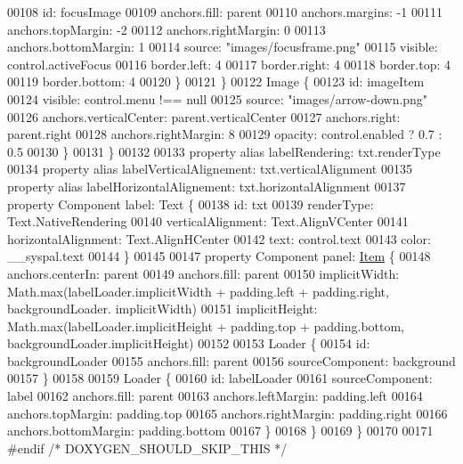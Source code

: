 \begin{DoxyCode}
00108                 \textcolor{keywordtype}{id}: focusImage
00109                 anchors.fill: parent
00110                 anchors.margins: -1
00111                 anchors.topMargin: -2
00112                 anchors.rightMargin: 0
00113                 anchors.bottomMargin: 1
00114                 source: \textcolor{stringliteral}{"images/focusframe.png"}
00115                 visible: control.activeFocus
00116                 border.left: 4
00117                 border.right: 4
00118                 border.top: 4
00119                 border.bottom: 4
00120             \}
00121         \}
00122         Image \{
00123             \textcolor{keywordtype}{id}: imageItem
00124             visible: control.menu !== null
00125             source: \textcolor{stringliteral}{"images/arrow-down.png"}
00126             anchors.verticalCenter: parent.verticalCenter
00127             anchors.right: parent.right
00128             anchors.rightMargin: 8
00129             opacity: control.enabled ? 0.7 : 0.5
00130         \}
00131     \}
00132 
00133     \textcolor{keyword}{property} alias labelRendering: txt.renderType
00134     \textcolor{keyword}{property} alias labelVerticalAlignement: txt.verticalAlignment
00135     \textcolor{keyword}{property} alias labelHorizontalAlignement: txt.horizontalAlignment
00137     \textcolor{keyword}{property} Component label: Text \{
00138         \textcolor{keywordtype}{id}: txt
00139         renderType: Text.NativeRendering
00140         verticalAlignment: Text.AlignVCenter
00141         horizontalAlignment: Text.AlignHCenter
00142         text: control.text
00143         color: \_\_syspal.text
00144     \}
00145 
00147     \textcolor{keyword}{property} Component panel: \hyperlink{classItem}{Item} \{
00148         anchors.centerIn: parent
00149         anchors.fill: parent
00150         implicitWidth: Math.max(labelLoader.implicitWidth + padding.left + padding.right, backgroundLoader.
      implicitWidth)
00151         implicitHeight: Math.max(labelLoader.implicitHeight + padding.top + padding.bottom, 
      backgroundLoader.implicitHeight)
00152 
00153         Loader \{
00154             \textcolor{keywordtype}{id}: backgroundLoader
00155             anchors.fill: parent
00156             sourceComponent: background
00157         \}
00158 
00159         Loader \{
00160             \textcolor{keywordtype}{id}: labelLoader
00161             sourceComponent: label
00162             anchors.fill: parent
00163             anchors.leftMargin: padding.left
00164             anchors.topMargin: padding.top
00165             anchors.rightMargin: padding.right
00166             anchors.bottomMargin: padding.bottom
00167         \}
00168     \}
00169 \}
00170 
00171 \textcolor{preprocessor}{#endif }\textcolor{comment}{/* DOXYGEN\_SHOULD\_SKIP\_THIS */}\textcolor{preprocessor}{}
\end{DoxyCode}
